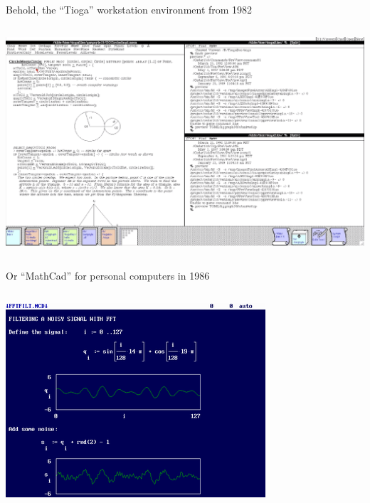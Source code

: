 \documentclass[aspectratio=169]{beamer}
\begin{document}
\begin{frame}{Behold, the ``Tioga'' workstation environment from 1982}
\vspace{0.2 cm}
\begin{columns}
\includegraphics[width=\linewidth]{../img/screenshot-1982-cedar-tioga.png}
\end{columns}
\end{frame}

\begin{frame}{Or ``MathCad'' for personal computers in 1986}
\vspace{0.2 cm}
\begin{columns}
\includegraphics[width=\linewidth]{../img/screenshot-1986-mathcad.png}
\end{columns}
\end{frame}
\end{document}
